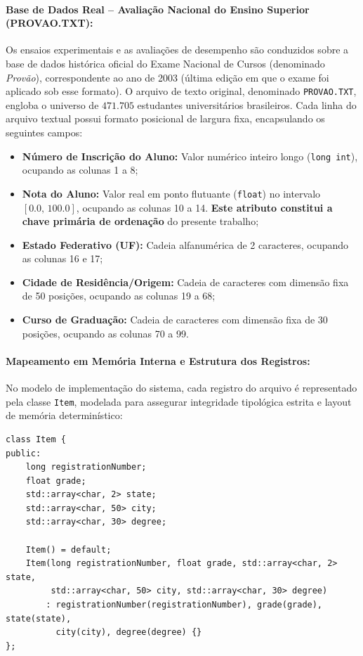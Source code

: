 \documentclass[12pt,a4paper]{article}
\begin{document}
\paragraph{Base de Dados Real -- Avaliação Nacional do Ensino Superior (PROVAO.TXT):}
Os ensaios experimentais e as avaliações de desempenho são conduzidos sobre a base de dados histórica oficial do Exame Nacional de Cursos (denominado \textit{Provão}), correspondente ao ano de 2003 (última edição em que o exame foi aplicado sob esse formato). O arquivo de texto original, denominado \texttt{PROVAO.TXT}, engloba o universo de $471.705$ estudantes universitários brasileiros. Cada linha do arquivo textual possui formato posicional de largura fixa, encapsulando os seguintes campos:
\begin{itemize}
    \item \textbf{Número de Inscrição do Aluno:} Valor numérico inteiro longo (\texttt{long int}), ocupando as colunas 1 a 8;
    \item \textbf{Nota do Aluno:} Valor real em ponto flutuante (\texttt{float}) no intervalo $[0.0, \, 100.0]$, ocupando as colunas 10 a 14. \textbf{Este atributo constitui a chave primária de ordenação} do presente trabalho;
    \item \textbf{Estado Federativo (UF):} Cadeia alfanumérica de 2 caracteres, ocupando as colunas 16 e 17;
    \item \textbf{Cidade de Residência/Origem:} Cadeia de caracteres com dimensão fixa de 50 posições, ocupando as colunas 19 a 68;
    \item \textbf{Curso de Graduação:} Cadeia de caracteres com dimensão fixa de 30 posições, ocupando as colunas 70 a 99.
\end{itemize}

\paragraph{Mapeamento em Memória Interna e Estrutura dos Registros:}
No modelo de implementação do sistema, cada registro do arquivo é representado pela classe \texttt{Item}, modelada para assegurar integridade tipológica estrita e layout de memória determinístico:
\begin{lstlisting}[caption={Estrutura de dados representativa de cada registro do Provão (Item.hpp).}]
class Item {
public:
    long registrationNumber;
    float grade;
    std::array<char, 2> state;
    std::array<char, 50> city;
    std::array<char, 30> degree;

    Item() = default;
    Item(long registrationNumber, float grade, std::array<char, 2> state,
         std::array<char, 50> city, std::array<char, 30> degree)
        : registrationNumber(registrationNumber), grade(grade), state(state),
          city(city), degree(degree) {}
};
\end{lstlisting}
\end{document}
